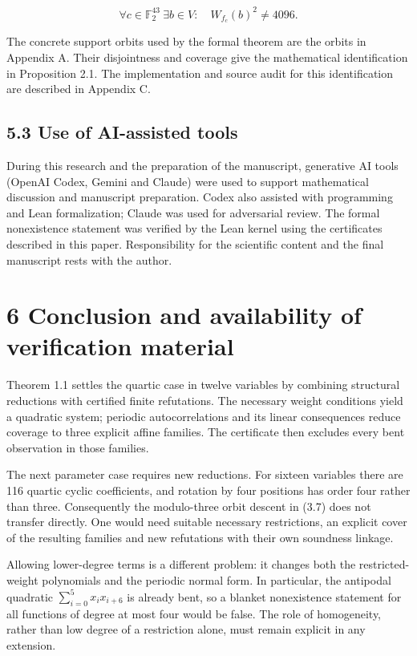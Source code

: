 \documentclass[11pt,a4paper]{article}
\begin{document}
\[
\forall c\in\mathbb F_2^{43}\ \exists b\in V:\quad W_{f_c}(b)^2\ne4096. \tag{5.1}
\]

The concrete support orbits used by the formal theorem are the orbits in Appendix A. Their disjointness and coverage give the mathematical identification in Proposition 2.1. The implementation and source audit for this identification are described in Appendix C.

\subsection*{5.3 Use of AI-assisted tools}

During this research and the preparation of the manuscript, generative AI tools (OpenAI Codex, Gemini and Claude) were used to support mathematical discussion and manuscript preparation. Codex also assisted with programming and Lean formalization; Claude was used for adversarial review. The formal nonexistence statement was verified by the Lean kernel using the certificates described in this paper. Responsibility for the scientific content and the final manuscript rests with the author.

\section*{6 Conclusion and availability of verification material}

Theorem 1.1 settles the quartic case in twelve variables by combining structural reductions with certified finite refutations. The necessary weight conditions yield a quadratic system; periodic autocorrelations and its linear consequences reduce coverage to three explicit affine families. The certificate then excludes every bent observation in those families.

The next parameter case requires new reductions. For sixteen variables there are 116 quartic cyclic coefficients, and rotation by four positions has order four rather than three. Consequently the modulo-three orbit descent in (3.7) does not transfer directly. One would need suitable necessary restrictions, an explicit cover of the resulting families and new refutations with their own soundness linkage.

Allowing lower-degree terms is a different problem: it changes both the restricted-weight polynomials and the periodic normal form. In particular, the antipodal quadratic $\sum_{i=0}^{5}x_ix_{i+6}$ is already bent, so a blanket nonexistence statement for all functions of degree at most four would be false. The role of homogeneity, rather than low degree of a restriction alone, must remain explicit in any extension.
\end{document}
